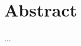 \documentclass[
    a4paper, %
	fontsize=10pt, %
	twoside=false, %
]{kaobook}
\begin{document}


\maketitle




\chapter*{Abstract}

...


\begingroup %

\setlength{\textheight}{230\vscale} %

\etocstandarddisplaystyle %
\etocstandardlines %

\tableofcontents %

\end{document}
